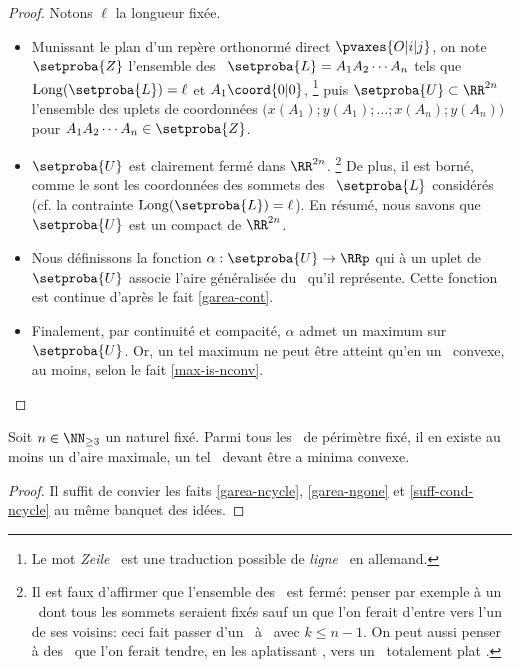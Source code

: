 \begin{proof}
	Notons $\ell$ la longueur fixée.
    \begin{itemize}
        \item Munissant le plan d'un repère orthonormé direct $\pvaxes{O | i | j}$, on note $\setproba{Z}$ l'ensemble des \ncycles\ $\setproba{L} = A_1 A_2 \cdots A_n$ tels que
        $\perim{\setproba{L}} = \ell$
        et
        $A_1\coord{0 | 0}$,%
        \footnote{
        	Le mot \og \emph{Zeile} \fg\ est une traduction possible de \og \emph{ligne} \fg\ en allemand.
        }
        puis $\setproba{U} \subset \RR^{2n}$ l'ensemble des uplets de coordonnées $\big( x(A_1) ; y(A_1) ; \dots ; x(A_n) ; y(A_n) \big)$ pour $A_1 A_2 \cdots A_n \in \setproba{Z}$.


        \item $\setproba{U}$ est clairement fermé dans $\RR^{2n}$.%
        \footnote{
        	Il est faux d'affirmer que l'ensemble des \ngones\ est fermé: penser par exemple à un \ngone\ dont tous les sommets seraient fixés sauf un que l'on ferait d'entre vers l'un de ses voisins: ceci fait passer d'un \ngone\ à \kgone\ avec $k \leq n-1$.
	        On peut aussi penser à des \ngones\ que l'on ferait tendre, en les \og aplatissant \fg, vers un \ncycle\ totalement \og plat \fg.
        }
        De plus, il est borné, comme le sont les coordonnées des sommets des \ncycles\ $\setproba{L}$ considérés (cf. la contrainte $\perim{\setproba{L}} = \ell$).
        En résumé, nous savons que $\setproba{U}$ est un compact de $\RR^{2n}$.


        \item Nous définissons la fonction $\alpha: \setproba{U} \rightarrow \RRp$ qui à un uplet de $\setproba{U}$ associe l'aire généralisée du \ncycle\ qu'il représente.
        Cette fonction est continue d'après le fait \ref{garea-cont}.


        \item Finalement, par continuité et compacité, $\alpha$ admet un maximum sur $\setproba{U}$.
        Or, un tel maximum ne peut être atteint qu'en un \ngone\ convexe, au moins, selon le fait \ref{max-is-nconv}.
    \end{itemize}
    
    \null\vspace{-6ex}
\end{proof}




\begin{fact} \label{suff-cond}
    Soit $n \in \NN_{\geq3}$ un naturel fixé.
    Parmi tous les \ngones\ de périmètre fixé, il en existe au moins un d'aire maximale, un tel \ngone\ devant être a minima convexe.
\end{fact}


\begin{proof}
    Il suffit de convier les faits \ref{garea-ncycle}, \ref{garea-ngone} et \ref{suff-cond-ncycle} au même banquet des idées.
\end{proof}
